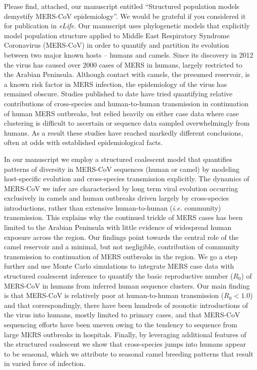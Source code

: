 \documentclass[stdletter,letterpaper,addrfromright,orderfromdateto,dateleft,11pt,noaddrto,sigleft]{newlfm}
\begin{document}
\begin{newlfm}
Please find, attached, our manuscript entitled ``Structured population models demystify MERS-CoV epidemiology''.
We would be grateful if you considered it for publication in \textit{eLife}.
Our manuscript uses phylogenetic models that explicitly model population structure applied to Middle East Respiratory Syndrome Coronavirus (MERS-CoV) in order to quantify and partition its evolution between two major known hosts -- humans and camels.
Since its discovery in 2012 the virus has caused over 2000 cases of MERS in humans, largely restricted to the Arabian Peninsula.
Although contact with camels, the presumed reservoir, is a known risk factor in MERS infection, the epidemiology of the virus has remained obscure.
Studies published to date have tried quantifying relative contributions of cross-species and human-to-human transmission in continuation of human MERS outbreaks, but relied heavily on either case data where case clustering is difficult to ascertain or sequence data sampled overwhelmingly from humans.
As a result these studies have reached markedly different conclusions, often at odds with established epidemiological facts.

In our manuscript we employ a structured coalescent model that quantifies patterns of diversity in MERS-CoV sequences (human or camel) by modeling host-specific evolution and cross-species transmission explicitly.
The dynamics of MERS-CoV we infer are characterised by long term viral evolution occurring exclusively in camels and human outbreaks driven largely by cross-species introductions, rather than extensive human-to-human (\textit{i.e.} community) transmission.
This explains why the continued trickle of MERS cases has been limited to the Arabian Peninsula with little evidence of widespread human exposure across the region.
Our findings point towards the central role of the camel reservoir and a minimal, but not negligible, contribution of community transmission to continuation of MERS outbreaks in the region.
We go a step further and use Monte Carlo simulations to integrate MERS case data with structured coalescent inference to quantify the basic reproductive number ($R_{0}$) of MERS-CoV in humans from inferred human sequence clusters.
Our main finding is that MERS-CoV is relatively poor at human-to-human transmission ($R_{0}<1.0$) and that correspondingly, there have been hundreds of zoonotic introductions of the virus into humans, mostly limited to primary cases, and that MERS-CoV sequencing efforts have been uneven owing to the tendency to sequence from large MERS outbreaks in hospitals.
Finally, by leveraging additional features of the structured coalescent we show that cross-species jumps into humans appear to be seasonal, which we attribute to seasonal camel breeding patterns that result in varied force of infection.


\end{newlfm}
\end{document}
